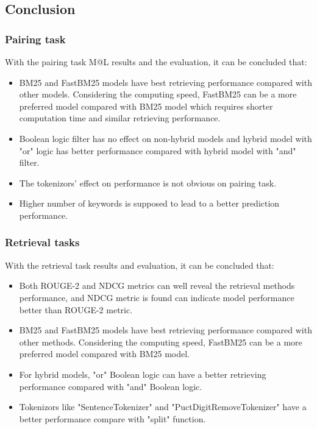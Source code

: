 \documentclass[10pt,a4paper,fleqn]{report}
\begin{document}
	\subsection{Conclusion}
		\subsubsection{Pairing task}
		
			With the pairing task M@L results and the evaluation, it can be concluded that:
			\begin{itemize}
				\item BM25 and FastBM25 models have best retrieving performance compared with other models. Considering the computing speed, FastBM25 can be a more preferred model compared with BM25 model which requires shorter computation time and similar retrieving performance.
				\item Boolean logic filter has no effect on non-hybrid models and hybrid model with "or" logic has better performance compared with hybrid model with "and" filter.
				\item The tokenizors' effect on performance is not obvious on pairing task.
				\item Higher number of keywords is supposed to lead to a better prediction performance.
			\end{itemize}
		
		\subsubsection{Retrieval tasks}
		
			With the retrieval task results and evaluation, it can be concluded that:
			\begin{itemize}
				\item Both ROUGE-2 and NDCG metrics can well reveal the retrieval methods performance, and NDCG metric is found can indicate model performance better than ROUGE-2 metric.
				\item BM25 and FastBM25 models have best retrieving performance compared with other methods. Considering the computing speed, FastBM25 can be a more preferred model compared with BM25 model.
				\item For hybrid models, "or" Boolean logic can have a better retrieving performance compared with "and" Boolean logic.
				\item Tokenizors like "SentenceTokenizer" and "PuctDigitRemoveTokenizer" have a better performance compare with "split" function.
			\end{itemize}
			
\end{document}
